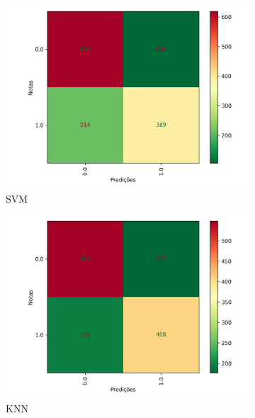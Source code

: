 \begin{figure}[!h]
\begin{subfigure}{0.4\textwidth}
 \centering
 \includegraphics[width=\textwidth]{figuras/exemplo/sandstone-cmSVM.png}
 \caption{SVM}
\end{subfigure}
\hfill
\begin{subfigure}{0.4\textwidth}
 \centering
 \includegraphics[width=\textwidth]{figuras/exemplo/sandstone-cmKNN.png}
 \caption{KNN}
\end{subfigure}
\hfill
\begin{subfigure}{0.4\textwidth}
 \centering

\end{subfigure}
\end{figure}
